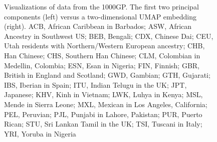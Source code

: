 \documentclass[12pt]{article}
\begin{document}
\begin{figure}[h!]
\begin{subfigure}[b]{0.45\linewidth}
    \caption{}
    \label{fig:UMAP}
  \end{subfigure}
  \caption{Visualizations of data from the 1000GP. The first two principal components (left) versus a two-dimensional UMAP embedding (right).     ACB, African Caribbean in Barbados;
    ASW, African Ancestry in Southwest US;
    BEB, Bengali;
    CDX, Chinese Dai;
    CEU, Utah residents with Northern/Western European ancestry;
    CHB, Han Chinese;
    CHS, Southern Han Chinese;
    CLM, Colombian in Medellin, Colombia;
    ESN, Esan in Nigeria;
    FIN, Finnish;
    GBR, British in England and Scotland;
    GWD, Gambian;
    GTH, Gujarati;
    IBS, Iberian in Spain;
    ITU, Indian Telugu in the UK;
    JPT, Japanese;
    KHV, Kinh in Vietnam;
    LWK, Luhya in Kenya;
    MSL, Mende in Sierra Leone;
    MXL, Mexican in Los Angeles, California;
    PEL, Peruvian;
    PJL, Punjabi in Lahore, Pakistan;
    PUR, Puerto Rican;
    STU, Sri Lankan Tamil in the UK;
    TSI, Tuscani in Italy;
    YRI, Yoruba in Nigeria }
  \label{fig:PCA_and_UMAP}
\end{figure}

\clearpage
\end{document}
